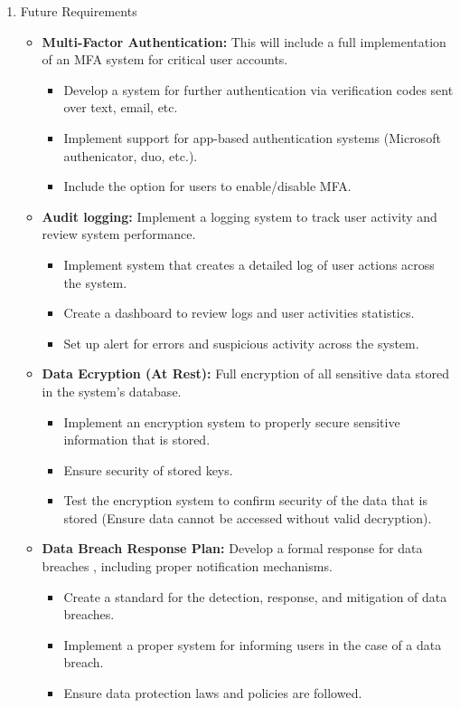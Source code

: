 \documentclass{article}
\begin{document}
\begin{enumerate}
\begin{itemize}
		\end{itemize}
	\item Future Requirements
		\begin{itemize}
			\item \textbf{Multi-Factor Authentication:} This will include a full implementation of an MFA system for critical user accounts.
			\begin{itemize}
				\item Develop a system for further authentication via verification codes sent over text, email, etc.
				\item Implement support for app-based authentication systems (Microsoft authenicator, duo, etc.).
				\item Include the option for users to enable/disable MFA.
			\end{itemize}
			\item \textbf{Audit logging:} Implement a logging system to track user activity and review system performance.
			\begin{itemize}
				\item Implement system that creates a detailed log of user actions across the system.
				\item Create a dashboard to review logs and user activities statistics.
				\item Set up alert for errors and suspicious activity across the system.
			\end{itemize}
			\item \textbf{Data Ecryption (At Rest):} Full encryption of all sensitive data stored in the system's database.
			\begin{itemize}
				\item Implement an encryption system to properly secure sensitive information that is stored.
				\item Ensure security of stored keys.
				\item Test the encryption system to confirm security of the data that is stored (Ensure data cannot be accessed without valid decryption).
			\end{itemize}
			\item \textbf{Data Breach Response Plan:} Develop a formal response for data breaches , including proper notification mechanisms.
			\begin{itemize}
				\item Create a standard for the detection, response, and mitigation of data breaches.
				\item Implement a proper system for informing users in the case of a data breach.
				\item Ensure data protection laws and policies are followed.
			\end{itemize}
		\end{itemize}
\end{enumerate}
\end{document}
